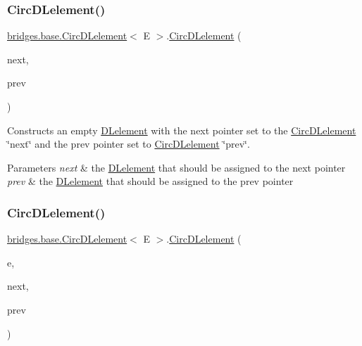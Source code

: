 \subsubsection{\texorpdfstring{Circ\+D\+Lelement()}{CircDLelement()}\hspace{0.1cm}{\footnotesize\ttfamily [3/4]}}
{\footnotesize\ttfamily \hyperlink{classbridges_1_1base_1_1_circ_d_lelement}{bridges.\+base.\+Circ\+D\+Lelement}$<$ E $>$.\hyperlink{classbridges_1_1base_1_1_circ_d_lelement}{Circ\+D\+Lelement} (\begin{DoxyParamCaption}\item[{\hyperlink{classbridges_1_1base_1_1_circ_d_lelement}{Circ\+D\+Lelement}$<$ E $>$}]{next,  }\item[{\hyperlink{classbridges_1_1base_1_1_circ_d_lelement}{Circ\+D\+Lelement}$<$ E $>$}]{prev }\end{DoxyParamCaption})}

Constructs an empty \hyperlink{classbridges_1_1base_1_1_d_lelement}{D\+Lelement} with the next pointer set to the \hyperlink{classbridges_1_1base_1_1_circ_d_lelement}{Circ\+D\+Lelement} \char`\"{}next\char`\"{} and the prev pointer set to \hyperlink{classbridges_1_1base_1_1_circ_d_lelement}{Circ\+D\+Lelement} \char`\"{}prev\char`\"{}.


\begin{DoxyParams}{Parameters}
{\em next} & the \hyperlink{classbridges_1_1base_1_1_d_lelement}{D\+Lelement} that should be assigned to the next pointer \\
\hline
{\em prev} & the \hyperlink{classbridges_1_1base_1_1_d_lelement}{D\+Lelement} that should be assigned to the prev pointer \\
\hline
\end{DoxyParams}
\mbox{\label{classbridges_1_1base_1_1_circ_d_lelement_a86e04c826251be9a1a92c4649844e5e7}} 
\subsubsection{\texorpdfstring{Circ\+D\+Lelement()}{CircDLelement()}\hspace{0.1cm}{\footnotesize\ttfamily [4/4]}}
{\footnotesize\ttfamily \hyperlink{classbridges_1_1base_1_1_circ_d_lelement}{bridges.\+base.\+Circ\+D\+Lelement}$<$ E $>$.\hyperlink{classbridges_1_1base_1_1_circ_d_lelement}{Circ\+D\+Lelement} (\begin{DoxyParamCaption}\item[{E}]{e,  }\item[{\hyperlink{classbridges_1_1base_1_1_circ_d_lelement}{Circ\+D\+Lelement}$<$ E $>$}]{next,  }\item[{\hyperlink{classbridges_1_1base_1_1_circ_d_lelement}{Circ\+D\+Lelement}$<$ E $>$}]{prev }\end{DoxyParamCaption})}

